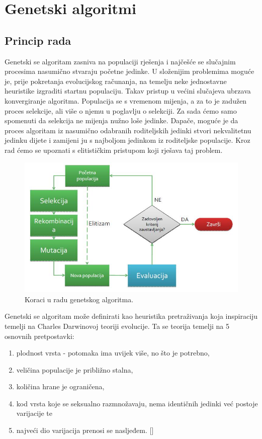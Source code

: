 \documentclass[times, utf8, zavrsni]{fer}
\begin{document}
\chapter{Genetski algoritmi}

\section{Princip rada}

Genetski se algoritam zasniva na populaciji rješenja i najčešće se slučajnim procesima nasumično stvaraju početne jedinke. U složenijim problemima moguće je, prije pokretanja evolucijskog računanja, na temelju neke jednostavne heuristike izgraditi startnu populaciju. Takav pristup u većini slučajeva ubrzava konvergiranje algoritma. Populacija se s vremenom mijenja, a za to je zadužen proces selekcije, ali više o njemu u poglavlju o selekciji. Za sada ćemo samo spomenuti da selekcija ne mijenja nužno loše jedinke. Dapače, moguće je da proces algoritam iz nasumično odabranih roditeljskih jedinki stvori nekvalitetnu jedinku dijete i zamijeni ju s najboljom jedinkom iz roditeljske populacije. Kroz rad ćemo se upoznati s elitističkim pristupom koji rješava taj problem. \\

\begin{figure}[!htb]
	\centering
	\includegraphics[width=15cm]{slike/genetskiGeneral.jpg}
	\caption{Koraci u radu genetskog algoritma. }
	\label{fig:genetic-general}
\end{figure}

Genetski se algoritam može definirati kao heuristika pretraživanja koja inspiraciju temelji na Charles Darwinovoj teoriji evolucije. Ta se teorija temelji na 5 osnovnih pretpostavki: \\
\begin{enumerate}
	\item plodnost vrsta - potomaka ima uvijek više, no što je potrebno,
	\item veličina populacije je približno stalna,
	\item količina hrane je ograničena,
	\item kod vrsta koje se seksualno razmnožavaju, nema identičnih jedinki već postoje varijacije te
	\item najveći dio varijacija prenosi se nasljeđem. [\citep{PIOA}]

\end{enumerate}
\end{document}
